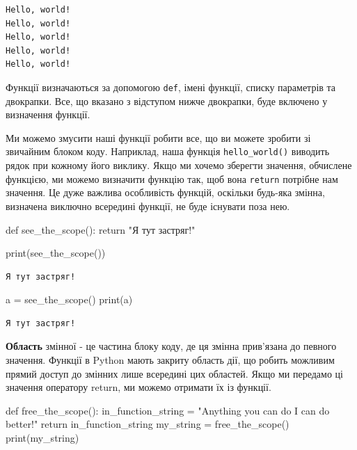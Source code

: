 \documentclass[
  letterpaper,
]{report}
\newenvironment{Shaded}{\begin{snugshade}}{\end{snugshade}}
\newcommand{\BuiltInTok}[1]{\textcolor[rgb]{0.00,0.23,0.31}{#1}}
\newcommand{\ControlFlowTok}[1]{\textcolor[rgb]{0.00,0.23,0.31}{#1}}
\newcommand{\KeywordTok}[1]{\textcolor[rgb]{0.00,0.23,0.31}{#1}}
\newcommand{\NormalTok}[1]{\textcolor[rgb]{0.00,0.23,0.31}{#1}}
\newcommand{\OperatorTok}[1]{\textcolor[rgb]{0.37,0.37,0.37}{#1}}
\newcommand{\StringTok}[1]{\textcolor[rgb]{0.13,0.47,0.30}{#1}}
\begin{document}
\begin{verbatim}
Hello, world!
Hello, world!
Hello, world!
Hello, world!
Hello, world!
\end{verbatim}

Функції визначаються за допомогою \texttt{def}, імені функції, списку
параметрів та двокрапки. Все, що вказано з відступом нижче двокрапки,
буде включено у визначення функції.

Ми можемо змусити наші функції робити все, що ви можете зробити зі
звичайним блоком коду. Наприклад, наша функція \texttt{hello\_world()}
виводить рядок при кожному його виклику. Якщо ми хочемо зберегти
значення, обчислене функцією, ми можемо визначити функцію так, щоб вона
\texttt{return} потрібне нам значення. Це дуже важлива особливість
функцій, оскільки будь-яка змінна, визначена виключно всередині функції,
не буде існувати поза нею.

\begin{Shaded}
\begin{Highlighting}[]
\KeywordTok{def}\NormalTok{ see\_the\_scope():}
    \ControlFlowTok{return} \StringTok{"Я тут застряг!"}

\BuiltInTok{print}\NormalTok{(see\_the\_scope())}
\end{Highlighting}
\end{Shaded}

\begin{verbatim}
Я тут застряг!
\end{verbatim}

\begin{Shaded}
\begin{Highlighting}[]
\NormalTok{a }\OperatorTok{=}\NormalTok{ see\_the\_scope()}
\BuiltInTok{print}\NormalTok{(a)}
\end{Highlighting}
\end{Shaded}

\begin{verbatim}
Я тут застряг!
\end{verbatim}

\textbf{Область} змінної - це частина блоку коду, де ця змінна
прив'язана до певного значення. Функції в Python мають закриту область
дії, що робить можливим прямий доступ до змінних лише всередині цих
областей. Якщо ми передамо ці значення оператору return, ми можемо
отримати їх із функції.

\begin{Shaded}
\begin{Highlighting}[]
\KeywordTok{def}\NormalTok{ free\_the\_scope():}
\NormalTok{    in\_function\_string }\OperatorTok{=} \StringTok{"Anything you can do I can do better!"}
    \ControlFlowTok{return}\NormalTok{ in\_function\_string}
\NormalTok{my\_string }\OperatorTok{=}\NormalTok{ free\_the\_scope()}
\BuiltInTok{print}\NormalTok{(my\_string)}
\end{Highlighting}
\end{Shaded}
\end{document}
